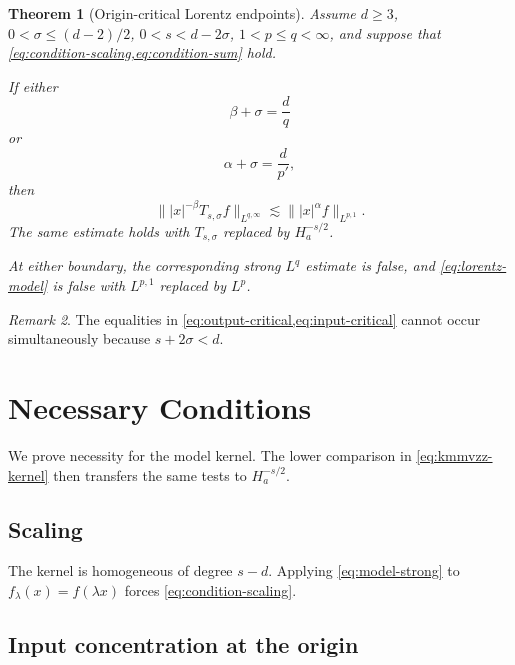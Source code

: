 \documentclass[11pt]{amsart}
\numberwithin{equation}{section}
\theoremstyle{plain}
\newtheorem{theorem}{Theorem}[section]
\theoremstyle{definition}
\theoremstyle{remark}
\newtheorem{remark}[theorem]{Remark}
\newcommand{\Ha}{H_a}
\begin{document}
\begin{theorem}[Origin-critical Lorentz endpoints]
\label{thm:endpoints}
Assume $d\ge3$, $0<\sigma\le(d-2)/2$, $0<s<d-2\sigma$, $1<p\le q<\infty$, and suppose that \cref{eq:condition-scaling,eq:condition-sum} hold.

If either
\begin{equation}
 \beta+\sigma=\frac d q
 \label{eq:output-critical}
\end{equation}
or
\begin{equation}
 \alpha+\sigma=\frac d{p'},
 \label{eq:input-critical}
\end{equation}
then
\begin{equation}
 \bigl\||x|^{-\beta}T_{s,\sigma}f\bigr\|_{L^{q,\infty}}
 \lesssim
 \bigl\||x|^\alpha f\bigr\|_{L^{p,1}}.
 \label{eq:lorentz-model}
\end{equation}
The same estimate holds with $T_{s,\sigma}$ replaced by $\Ha^{-s/2}$.

At either boundary, the corresponding strong $L^q$ estimate is false, and \cref{eq:lorentz-model} is false with $L^{p,1}$ replaced by $L^p$.
\end{theorem}

\begin{remark}
\label{rem:critical-boundaries}
The equalities in \cref{eq:output-critical,eq:input-critical} cannot occur simultaneously because $s+2\sigma<d$.
\end{remark}

\section{Necessary Conditions}
\label{sec:necessity}

We prove necessity for the model kernel. The lower comparison in \cref{eq:kmmvzz-kernel} then transfers the same tests to $\Ha^{-s/2}$.

\subsection{Scaling}

The kernel is homogeneous of degree $s-d$. Applying \cref{eq:model-strong} to $f_\lambda(x)=f(\lambda x)$ forces \cref{eq:condition-scaling}.

\subsection{Input concentration at the origin}
\end{document}
